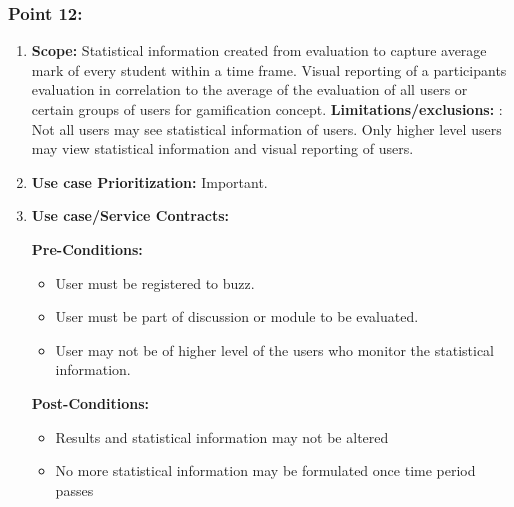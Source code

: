 \documentclass[11pt]{article}
\begin{document}
\subsubsection{Point 12:}
\begin{enumerate}
\item 
\textbf{Scope:}
Statistical information created from evaluation to capture average mark of every student within a time frame. Visual reporting of a participants evaluation in correlation to the average of the evaluation of all users or certain groups of users for gamification concept.
\newline
\textbf{Limitations/exclusions:} : Not all users may see statistical information of users. Only higher level users may view statistical information and visual reporting of users.

\item 
\textbf{Use case Prioritization:} Important.

\item 
\textbf{Use case/Service Contracts:} 

\textbf{Pre-Conditions: }
\begin{itemize}
\item User must be registered to buzz.

\item User must be part of discussion or module to be evaluated.

\item User may not be of higher level of the users who monitor the statistical information.


\end{itemize}
 

\textbf{Post-Conditions: }
\begin{itemize}

\item Results and statistical information may not be altered
\item No more statistical information may be formulated once time period passes


\end{itemize}
\end{enumerate}
\end{document}
